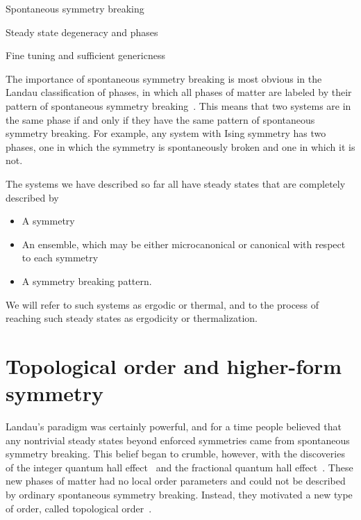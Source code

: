 Spontaneous symmetry breaking








Steady state degeneracy and phases










Fine tuning and sufficient genericness














The importance of spontaneous symmetry breaking is most obvious in the Landau classification of phases, in which all phases of matter are labeled by their pattern of spontaneous symmetry breaking~\cite{Landau1980Statistical}. This means that two systems are in the same phase if and only if they have the same pattern of spontaneous symmetry breaking. For example, any system with Ising symmetry has two phases, one in which the symmetry is spontaneously broken and one in which it is not.


The systems we have described so far all have steady states that are completely described by
\begin{itemize}
\item A symmetry
\item An ensemble, which may be either microcanonical or canonical with respect to each symmetry
\item A symmetry breaking pattern.
\end{itemize}
We will refer to such systems as ergodic or thermal, and to the process of reaching such steady states as ergodicity or thermalization.





\section{Topological order and higher-form symmetry}

Landau's paradigm was certainly powerful, and for a time people believed that any nontrivial steady states beyond enforced symmetries came from spontaneous symmetry breaking. This belief began to crumble, however, with the discoveries of the integer quantum hall effect~\cite{Klitzing1980Quantized} and the fractional quantum hall effect~\cite{Tsui1982Extreme}.  These new phases of matter had no local order parameters and could not be described by ordinary spontaneous symmetry breaking. Instead, they motivated a new type of order, called topological order~\cite{Wen1990Topological}.

